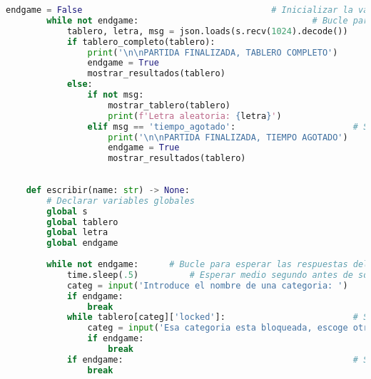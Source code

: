 \documentclass{article}
\begin{document}
\begin{lstlisting}[language=Python, caption={Código Python}, label={lst:python_code}]
        endgame = False                                     # Inicializar la variable de fin de juego como False
        while not endgame:                                  # Bucle para leer continuamente datos hasta que el juego termine
            tablero, letra, msg = json.loads(s.recv(1024).decode())     # Leer datos recibidos y decodificar JSON
            if tablero_completo(tablero):                               # Verificar si el tablero esta completo
                print('\n\nPARTIDA FINALIZADA, TABLERO COMPLETO')
                endgame = True                                          # Establecer el fin del juego como True
                mostrar_resultados(tablero)                             # Mostrar resultados finales del juego
            else:
                if not msg:                                             # Si no hay mensaje adicional
                    mostrar_tablero(tablero)                                # Mostrar el tablero actual
                    print(f'Letra aleatoria: {letra}')                      
                elif msg == 'tiempo_agotado':                       # Si el mensaje indica que el tiempo se ha agotado
                    print('\n\nPARTIDA FINALIZADA, TIEMPO AGOTADO')     # Mostrar mensaje de finalizacion por tiempo agotado
                    endgame = True                                      # Establecer el fin del juego como True
                    mostrar_resultados(tablero)                         # Mostrar resultados finales del juego
    
    
    def escribir(name: str) -> None:
        # Declarar variables globales
        global s
        global tablero
        global letra
        global endgame
    
        while not endgame:      # Bucle para esperar las respuestas del jugador hasta que el juego termine
            time.sleep(.5)          # Esperar medio segundo antes de solicitar la entrada del jugador
            categ = input('Introduce el nombre de una categoria: ')     # Solicitar al jugador el nombre de una categoria
            if endgame:                                                 # Si el juego ha terminado
                break
            while tablero[categ]['locked']:                         # Si la categoria esta bloqueada en el tablero
                categ = input('Esa categoria esta bloqueada, escoge otra: ')    # Solicitar al jugador otra categoria
                if endgame:                                                     # Si el juego ha terminado
                    break
            if endgame:                                             # Si el juego ha terminado
                break
    

\end{lstlisting}
\end{document}
